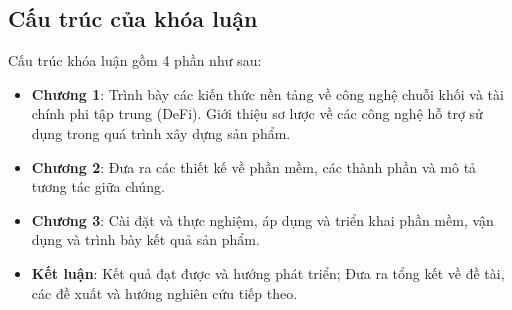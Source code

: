 \subsection*{Cấu trúc của khóa luận}
Cấu trúc khóa luận gồm 4 phần như sau:
\begin{itemize}
  \item \textbf{Chương 1}: Trình bày các kiến thức nền tảng về công nghệ chuỗi khối và
        tài chính phi tập trung (DeFi). Giới thiệu sơ lược về các công nghệ hỗ trợ sử
        dụng trong quá trình xây dựng sản phẩm.

  \item \textbf{Chương 2}: Đưa ra các thiết kế về phần mềm, các thành phần và
        mô tả tương tác giữa chúng.

  \item \textbf{Chương 3}: Cài đặt và thực nghiệm, áp dụng và triển khai phần
        mềm, vận dụng và trình bày kết quả sản phẩm.

  \item \textbf{Kết luận}: Kết quả đạt được và hướng phát triển; Đưa ra tổng
        kết về đề tài, các đề xuất và hướng nghiên cứu tiếp theo.
\end{itemize}